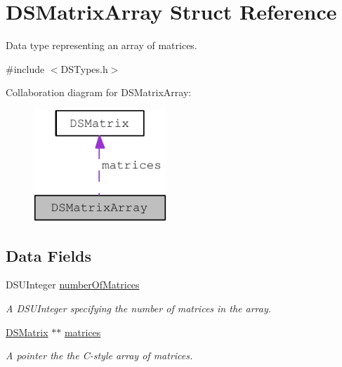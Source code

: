 \hypertarget{struct_d_s_matrix_array}{
\section{DSMatrixArray Struct Reference}
\label{struct_d_s_matrix_array}
}


Data type representing an array of matrices.  




{\ttfamily \#include $<$DSTypes.h$>$}



Collaboration diagram for DSMatrixArray:\nopagebreak
\begin{figure}[H]
\begin{center}
\leavevmode
\includegraphics[width=142pt]{struct_d_s_matrix_array__coll__graph}
\end{center}
\end{figure}
\subsection*{Data Fields}
\begin{DoxyCompactItemize}
\item 
\hypertarget{struct_d_s_matrix_array_ab5f4da8dd96ac570199f6ead749797aa}{
DSUInteger \hyperlink{struct_d_s_matrix_array_ab5f4da8dd96ac570199f6ead749797aa}{numberOfMatrices}}
\label{struct_d_s_matrix_array_ab5f4da8dd96ac570199f6ead749797aa}

\begin{DoxyCompactList}\small\item\em A DSUInteger specifying the number of matrices in the array. \item\end{DoxyCompactList}\item 
\hypertarget{struct_d_s_matrix_array_a48afc9204e98afffd4acd6a5175e30f4}{
\hyperlink{struct_d_s_matrix}{DSMatrix} $\ast$$\ast$ \hyperlink{struct_d_s_matrix_array_a48afc9204e98afffd4acd6a5175e30f4}{matrices}}
\label{struct_d_s_matrix_array_a48afc9204e98afffd4acd6a5175e30f4}

\begin{DoxyCompactList}\small\item\em A pointer the the C-\/style array of matrices. \item\end{DoxyCompactList}\end{DoxyCompactItemize}


